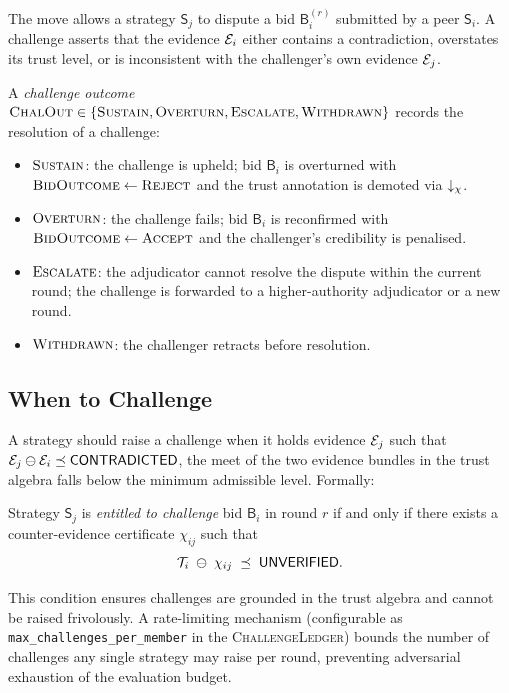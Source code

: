 \documentclass[11pt]{article}
\providecommand{\Strat}{\mathsf{S}}               %
\providecommand{\Bid}{\mathsf{B}}                 %
\providecommand{\BidOut}{\textsc{BidOutcome}}     %
\providecommand{\ChalOut}{\textsc{ChalOut}}       %
\providecommand{\ACCEPT}{\textsc{Accept}}
\providecommand{\REJECT}{\textsc{Reject}}
\providecommand{\ESCALATE}{\textsc{Escalate}}
\providecommand{\SUSTAIN}{\textsc{Sustain}}
\providecommand{\OVERTURN}{\textsc{Overturn}}
\begin{document}
The \CHALLENGE{} move allows a strategy $\Strat_j$ to dispute a bid
$\Bid_i^{(r)}$ submitted by a peer $\Strat_i$.  A challenge asserts that the
evidence $\mathcal{E}_i$ either contains a contradiction, overstates its trust level,
or is inconsistent with the challenger's own evidence $\mathcal{E}_j$.

\begin{definition}[\ChalOut{}]\label{def:chalout}
A \emph{challenge outcome} $\ChalOut \in \{\SUSTAIN, \OVERTURN, \ESCALATE,
\textsc{Withdrawn}\}$ records the resolution of a challenge:
\begin{itemize}
  \item $\SUSTAIN$: the challenge is upheld; bid $\Bid_i$ is overturned
    with $\BidOut \leftarrow \REJECT$ and the trust annotation is demoted via
    $\downarrow_\chi$.
  \item $\OVERTURN$: the challenge fails; bid $\Bid_i$ is reconfirmed with
    $\BidOut \leftarrow \ACCEPT$ and the challenger's credibility is penalised.
  \item $\ESCALATE$: the adjudicator cannot resolve the dispute within the
    current round; the challenge is forwarded to a higher-authority
    adjudicator or a new round.
  \item $\textsc{Withdrawn}$: the challenger retracts before resolution.
\end{itemize}
\end{definition}

\subsection{When to Challenge}

A strategy should raise a challenge when it holds evidence $\mathcal{E}_j$ such that
$\mathcal{E}_j \ominus \mathcal{E}_i \preceq \mathsf{CONTRADICTED}$, \ie{} the meet of the two evidence
bundles in the trust algebra falls below the minimum admissible level.
Formally:

\begin{definition}\label{def:challcond}
Strategy $\Strat_j$ is \emph{entitled to challenge} bid $\Bid_i$ in round $r$
if and only if there exists a counter-evidence certificate $\chi_{ij}$ such that
\[
  \mathcal{T}_i \;\ominus\; \chi_{ij} \;\preceq\; \mathsf{UNVERIFIED}.
\]
\end{definition}

This condition ensures challenges are grounded in the trust algebra and cannot
be raised frivolously.  A rate-limiting mechanism (configurable as
\texttt{max\_challenges\_per\_member} in the \textsc{ChallengeLedger}) bounds
the number of challenges any single strategy may raise per round, preventing
adversarial exhaustion of the evaluation budget.
\end{document}
